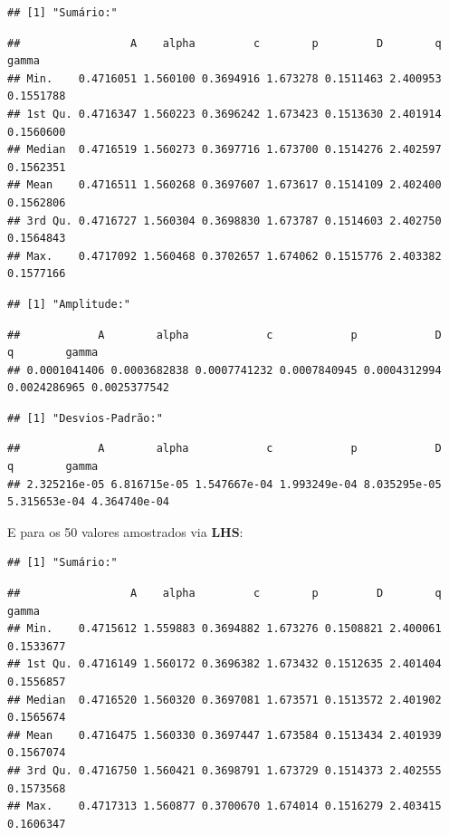 \documentclass[11pt,]{article}
\begin{document}
\begin{verbatim}
## [1] "Sumário:"
\end{verbatim}

\begin{verbatim}
##                 A    alpha         c        p         D        q     gamma
## Min.    0.4716051 1.560100 0.3694916 1.673278 0.1511463 2.400953 0.1551788
## 1st Qu. 0.4716347 1.560223 0.3696242 1.673423 0.1513630 2.401914 0.1560600
## Median  0.4716519 1.560273 0.3697716 1.673700 0.1514276 2.402597 0.1562351
## Mean    0.4716511 1.560268 0.3697607 1.673617 0.1514109 2.402400 0.1562806
## 3rd Qu. 0.4716727 1.560304 0.3698830 1.673787 0.1514603 2.402750 0.1564843
## Max.    0.4717092 1.560468 0.3702657 1.674062 0.1515776 2.403382 0.1577166
\end{verbatim}

\begin{verbatim}
## [1] "Amplitude:"
\end{verbatim}

\begin{verbatim}
##            A        alpha            c            p            D            q        gamma 
## 0.0001041406 0.0003682838 0.0007741232 0.0007840945 0.0004312994 0.0024286965 0.0025377542
\end{verbatim}

\begin{verbatim}
## [1] "Desvios-Padrão:"
\end{verbatim}

\begin{verbatim}
##            A        alpha            c            p            D            q        gamma 
## 2.325216e-05 6.816715e-05 1.547667e-04 1.993249e-04 8.035295e-05 5.315653e-04 4.364740e-04
\end{verbatim}

E para os 50 valores amostrados via \textbf{LHS}:

\begin{verbatim}
## [1] "Sumário:"
\end{verbatim}

\begin{verbatim}
##                 A    alpha         c        p         D        q     gamma
## Min.    0.4715612 1.559883 0.3694882 1.673276 0.1508821 2.400061 0.1533677
## 1st Qu. 0.4716149 1.560172 0.3696382 1.673432 0.1512635 2.401404 0.1556857
## Median  0.4716520 1.560320 0.3697081 1.673571 0.1513572 2.401902 0.1565674
## Mean    0.4716475 1.560330 0.3697447 1.673584 0.1513434 2.401939 0.1567074
## 3rd Qu. 0.4716750 1.560421 0.3698791 1.673729 0.1514373 2.402555 0.1573568
## Max.    0.4717313 1.560877 0.3700670 1.674014 0.1516279 2.403415 0.1606347
\end{verbatim}
\end{document}
